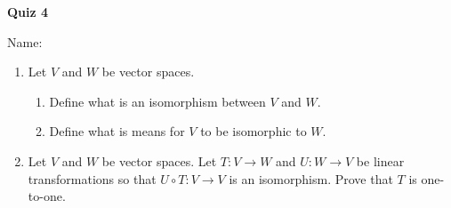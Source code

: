\documentclass{article}
\begin{document}
\begin{center}
    {\bf Quiz 4}
\end{center}
Name:


\begin{enumerate}
    \item
        Let $V$ and $W$ be vector spaces.
        \begin{enumerate}
            \item 
                Define what is an isomorphism between $V$ and $W$.
                \vfill
            \item
                Define what is means for $V$ to be isomorphic to $W$.
                \vfill
        \end{enumerate}
    \item
        Let $V$ and $W$ be vector spaces. Let $T:V\to W$ and $U:W\to V$ be
        linear transformations so that $U\circ T:V\to V$ is an isomorphism.
        Prove that $T$ is one-to-one.
        \vfill
        \vfill
        \vfill
\end{enumerate}
    
\end{document}
